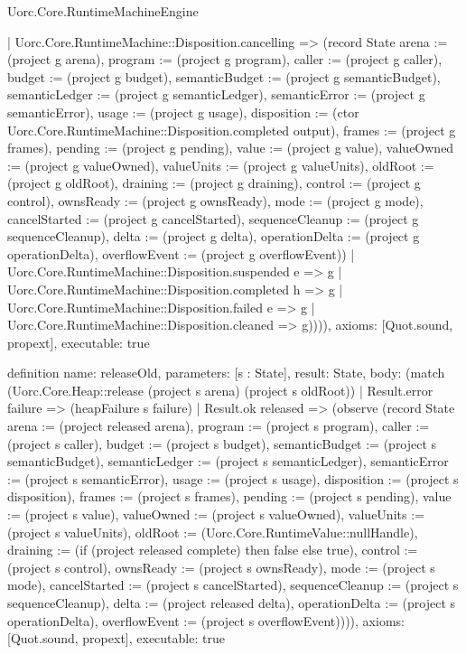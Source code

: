 \begin{lexlean}{Uorc.Core.RuntimeMachineEngine}
\begin{semanticmodule}
{        | Uorc.Core.RuntimeMachine::Disposition.cancelling => (record State {arena := (project g arena), program := (project g program), caller := (project g caller), budget := (project g budget), semanticBudget := (project g semanticBudget), semanticLedger := (project g semanticLedger), semanticError := (project g semanticError), usage := (project g usage), disposition := (ctor Uorc.Core.RuntimeMachine::Disposition.completed output), frames := (project g frames), pending := (project g pending), value := (project g value), valueOwned := (project g valueOwned), valueUnits := (project g valueUnits), oldRoot := (project g oldRoot), draining := (project g draining), control := (project g control), ownsReady := (project g ownsReady), mode := (project g mode), cancelStarted := (project g cancelStarted), sequenceCleanup := (project g sequenceCleanup), delta := (project g delta), operationDelta := (project g operationDelta), overflowEvent := (project g overflowEvent)})
        | Uorc.Core.RuntimeMachine::Disposition.suspended e => g
        | Uorc.Core.RuntimeMachine::Disposition.completed h => g
        | Uorc.Core.RuntimeMachine::Disposition.failed e => g
        | Uorc.Core.RuntimeMachine::Disposition.cleaned => g)))),
  axioms: [Quot.sound, propext],
  executable: true
}

definition{
  name: releaseOld,
  parameters: [s : State],
  result: State,
  body: (match (Uorc.Core.Heap::release (project s arena) (project s oldRoot))
    | Result.error failure => (heapFailure s failure)
    | Result.ok released => (observe (record State {arena := (project released arena), program := (project s program), caller := (project s caller), budget := (project s budget), semanticBudget := (project s semanticBudget), semanticLedger := (project s semanticLedger), semanticError := (project s semanticError), usage := (project s usage), disposition := (project s disposition), frames := (project s frames), pending := (project s pending), value := (project s value), valueOwned := (project s valueOwned), valueUnits := (project s valueUnits), oldRoot := (Uorc.Core.RuntimeValue::nullHandle), draining := (if (project released complete) then false else true), control := (project s control), ownsReady := (project s ownsReady), mode := (project s mode), cancelStarted := (project s cancelStarted), sequenceCleanup := (project s sequenceCleanup), delta := (project released delta), operationDelta := (project s operationDelta), overflowEvent := (project s overflowEvent)}))),
  axioms: [Quot.sound, propext],
  executable: true
}


\end{semanticmodule}
\end{lexlean}
